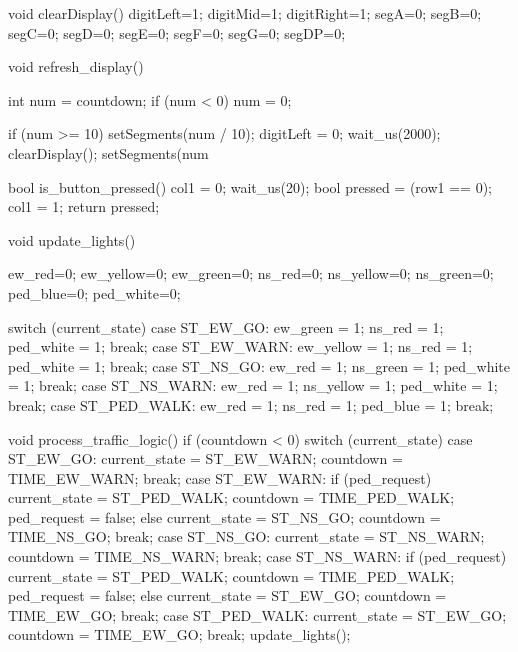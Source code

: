 \begin{cpp}
void clearDisplay() {
    digitLeft=1; digitMid=1; digitRight=1;
    segA=0; segB=0; segC=0; segD=0; segE=0; segF=0; segG=0; segDP=0;
}

void refresh_display() {
    int num = countdown;
    if (num < 0) num = 0;
    
    if (num >= 10) {
        setSegments(num / 10); digitLeft = 0; wait_us(2000); clearDisplay();
    }
    setSegments(num %
}

bool is_button_pressed() {
    col1 = 0; 
    wait_us(20);
    bool pressed = (row1 == 0); 
    col1 = 1; 
    return pressed;
}

void update_lights() {
    ew_red=0; ew_yellow=0; ew_green=0;
    ns_red=0; ns_yellow=0; ns_green=0;
    ped_blue=0; ped_white=0; 

    switch (current_state) {
        case ST_EW_GO: 
            ew_green = 1; ns_red = 1; ped_white = 1; 
            break;
        case ST_EW_WARN: 
            ew_yellow = 1; ns_red = 1; ped_white = 1;
            break;
        case ST_NS_GO: 
            ew_red = 1; ns_green = 1; ped_white = 1;
            break;
        case ST_NS_WARN: 
            ew_red = 1; ns_yellow = 1; ped_white = 1;
            break;
        case ST_PED_WALK: 
            ew_red = 1; ns_red = 1; ped_blue = 1;  
            break;
    }
}

void process_traffic_logic() {
    if (countdown < 0) {
        switch (current_state) {
            case ST_EW_GO:
                current_state = ST_EW_WARN;
                countdown = TIME_EW_WARN;
                break;
            case ST_EW_WARN:
                if (ped_request) {
                    current_state = ST_PED_WALK;
                    countdown = TIME_PED_WALK;
                    ped_request = false; 
                } else {
                    current_state = ST_NS_GO;
                    countdown = TIME_NS_GO;
                }
                break;
            case ST_NS_GO:
                current_state = ST_NS_WARN;
                countdown = TIME_NS_WARN;
                break;
            case ST_NS_WARN:
                if (ped_request) {
                    current_state = ST_PED_WALK;
                    countdown = TIME_PED_WALK;
                    ped_request = false;
                } else {
                    current_state = ST_EW_GO;
                    countdown = TIME_EW_GO;
                }
                break;
            case ST_PED_WALK:
                current_state = ST_EW_GO;
                countdown = TIME_EW_GO;
                break;
        }
        update_lights();
    }
}


\end{cpp}
